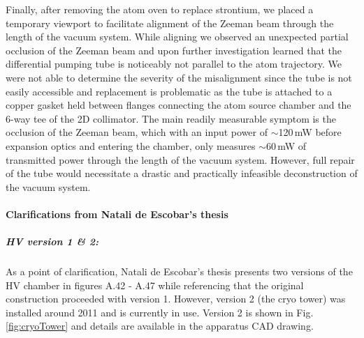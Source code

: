 Finally, after removing the atom oven to replace strontium, we placed a temporary viewport to facilitate alignment of the Zeeman beam through the length of the vacuum system. 
While aligning we observed an unexpected partial occlusion of the Zeeman beam and upon further investigation learned that the differential pumping tube is noticeably not parallel to the atom trajectory.
We were not able to determine the severity of the misalignment since the tube is not easily accessible and replacement is problematic as the tube is attached to a copper gasket held between flanges connecting the atom source chamber and the 6-way tee of the 2D collimator. 
The main readily measurable symptom is the occlusion of the Zeeman beam, which with an input power of $\sim$120\,mW before expansion optics and entering the chamber, only measures $\sim$60\,mW of transmitted power through the length of the vacuum system. 
However, full repair of the tube would necessitate a drastic and practically infeasible deconstruction of the vacuum system.

\paragraph{Clarifications from Natali de Escobar's thesis}
\subparagraph{HV version 1 \& 2:}
As a point of clarification, Natali de Escobar's thesis \cite{MartinezdeEscolar2010} presents two versions of the HV chamber in figures A.42 - A.47 while referencing that the original construction proceeded with version 1. 
However, version 2 (the cryo tower) was installed around 2011 and is currently in use. Version 2 is shown in Fig.\,\ref{fig:cryoTower} and details are available in the apparatus CAD drawing.

